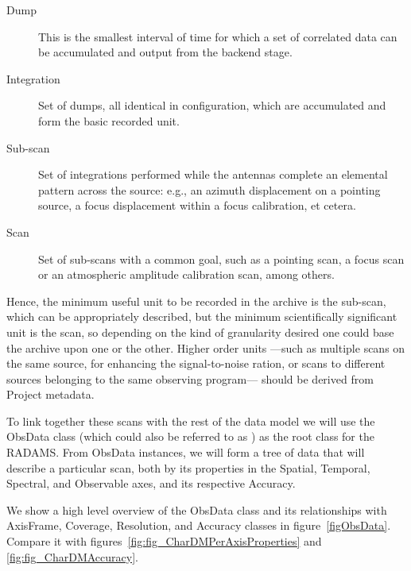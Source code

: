 		\begin{description}
			\item[Dump] This is the smallest interval of time for
			which a set of correlated data can be accumulated and
			output from the backend stage.
			
			 \item[Integration] Set of dumps, all identical in
			configuration, which are accumulated and form the basic
			recorded unit.
			
			 \item[Sub-scan] Set of integrations performed while
			the antennas complete an elemental pattern across the
			source: e.g., an azimuth displacement on a pointing 
			source, a focus displacement within a focus calibration,
			et cetera.
			
			 \item[Scan] Set of sub-scans with a common goal, such
			as a pointing scan, a focus scan or an atmospheric
			amplitude calibration scan, among others.
		\end{description}
			
		Hence, the minimum useful unit to be recorded in the
		archive is the sub-scan, which can be appropriately
		described, but the minimum scientifically significant unit
		is the scan, so depending on the kind of granularity
		desired one could base the archive upon one or the other.
		Higher order units ---such as multiple scans on the same
		source, for enhancing the signal-to-noise ration, or
		scans to different sources belonging to the same observing 
		program--- should be derived from Project metadata.
		
		 To link together these scans with the rest of the data model
		we will use the ObsData class
		(which could also be referred to as ) as the root
		class for the RADAMS. From ObsData instances, we will form
		a tree of data that will describe a particular scan, both
		by its properties in the Spatial, Temporal, Spectral, and
		Observable axes, and its respective Accuracy.
		
		 We show a high level overview of the ObsData class and its
		relationships with AxisFrame, Coverage, Resolution, and
		Accuracy classes in figure~\ref{figObsData}. Compare it 
		with figures~\ref{fig:fig_CharDMPerAxisProperties} and
		\ref{fig:fig_CharDMAccuracy}.
		
